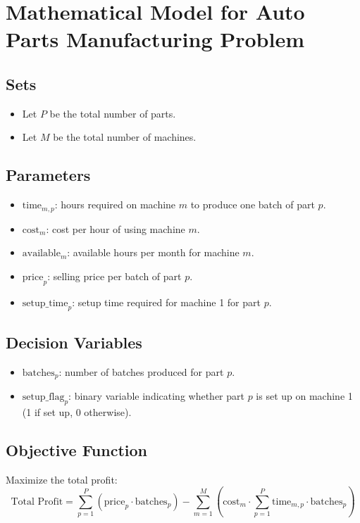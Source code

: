 \documentclass{article}
\begin{document}
\section*{Mathematical Model for Auto Parts Manufacturing Problem}

\subsection*{Sets}
\begin{itemize}
    \item Let \( P \) be the total number of parts.
    \item Let \( M \) be the total number of machines.
\end{itemize}

\subsection*{Parameters}
\begin{itemize}
    \item \( \text{time}_{m,p} \): hours required on machine \( m \) to produce one batch of part \( p \).
    \item \( \text{cost}_{m} \): cost per hour of using machine \( m \).
    \item \( \text{available}_{m} \): available hours per month for machine \( m \).
    \item \( \text{price}_{p} \): selling price per batch of part \( p \).
    \item \( \text{setup\_time}_{p} \): setup time required for machine 1 for part \( p \).
\end{itemize}

\subsection*{Decision Variables}
\begin{itemize}
    \item \( \text{batches}_{p} \): number of batches produced for part \( p \).
    \item \( \text{setup\_flag}_{p} \): binary variable indicating whether part \( p \) is set up on machine 1 (1 if set up, 0 otherwise).
\end{itemize}

\subsection*{Objective Function}
Maximize the total profit:
\[
\text{Total Profit} = \sum_{p=1}^{P} \left( \text{price}_{p} \cdot \text{batches}_{p} \right) - \sum_{m=1}^{M} \left( \text{cost}_{m} \cdot \sum_{p=1}^{P} \text{time}_{m,p} \cdot \text{batches}_{p} \right)
\]
\end{document}

